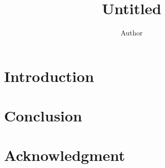 \documentclass[12pt,a4paper,final]{article}
\title{Untitled}
\author{Author}
\begin{document}
\maketitle
\begin{abstract}
\end{abstract}
\begin{keywords}
\end{keywords}
\section{Introduction}
\section{Conclusion}
\section*{Acknowledgment}
\end{document}
